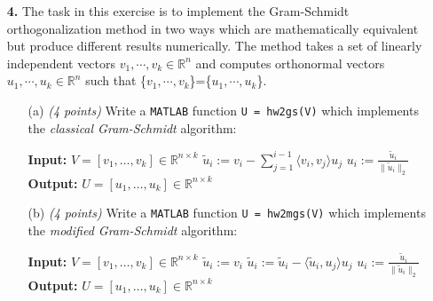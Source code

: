 \documentclass[10pt]{report}
\begin{document}
\begin{enumerate}


 \item[\textbf{4.}]
 The task in this exercise is to implement the Gram-Schmidt
  orthogonalization method in two ways which are mathematically equivalent but
  produce different results numerically. The method takes a set of linearly
  independent vectors $v_1,\cdots,v_k\in\mathbb{R}^n$ and computes
  orthonormal vectors $u_1,\cdots,u_k\in\mathbb{R}^n$ such that 
  \{$v_1,\cdots,v_k$\}=\{$u_1,\cdots,u_k$\}. 
  \begin{enumerate}

    \item[(a)]  \textit{(4 points)} Write a \verb+MATLAB+ function \verb+U = hw2gs(V)+ which
    implements the \textit{classical Gram-Schmidt} algorithm:
    \begin{algorithmic}
    \State \textbf{Input:} $V=[v_1,\ldots,v_k]\in\mathbb{R}^{n\times k}$ 
    \State $\tilde{u}_i:=v_i-\sum_{j=1}^{i-1}\langle v_i,v_j\rangle u_j$ 
    \State $u_i:=\frac{\tilde{u}_i}{\|\tilde{u}_i\|_2}$
    \EndFor
    \State \textbf{Output:} $U=[u_1,\ldots,u_k]\in\mathbb{R}^{n\times k}$ 
    \end{algorithmic}

    \item[(b)] \textit{(4 points)}  Write a \verb+MATLAB+ function \verb+U = hw2mgs(V)+ which
    implements the \textit{modified Gram-Schmidt} algorithm:
    \begin{algorithmic}
    \State \textbf{Input:} $V=[v_1,\ldots,v_k]\in\mathbb{R}^{n\times k}$ 
    \State $\tilde{u}_i:=v_i$
    \State $\tilde{u}_i:=\tilde{u}_i-\langle \tilde{u}_i,u_j\rangle u_j$ 
    \EndFor
    \State $u_i:=\frac{\tilde{u}_i}{\|\tilde{u}_i\|_2}$
    \EndFor
    \State \textbf{Output:} $U=[u_1,\ldots,u_k]\in\mathbb{R}^{n\times k}$ 
    \end{algorithmic}
          

\end{enumerate}
\end{enumerate}
\end{document}
